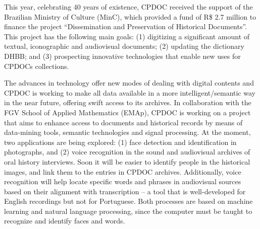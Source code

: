 

This year, celebrating 40 years of existence, CPDOC received the
support of the Brazilian Ministry of Culture (MinC), which provided a
fund of R\$ 2.7 million to finance the project ``Dissemination and
Preservation of Historical Documents''. This project has the following
main goals: (1) digitizing a significant amount of textual,
iconographic and audiovisual documents; (2) updating the dictionary
DHBB; and (3) prospecting innovative technologies that enable new uses
for CPDOCs collections.

The advances in technology offer new modes of dealing with digital
contents and CPDOC is working to make all data available in a more
intelligent/semantic way in the near future, offering swift access to
its archives. In collaboration with the FGV School of Applied
Mathematics (EMAp), CPDOC is working on a project that aims to enhance
access to documents and historical records by means of data-mining
tools, semantic technologies and signal processing. At the moment, two
applications are being explored: (1) face detection and identification
in photographs, and (2) voice recognition in the sound and audiovisual
archives of oral history interviews. Soon it will be easier to
identify people in the historical images, and link them to the entries
in CPDOC archives. Additionally, voice recognition will help locate
specific words and phrases in audiovisual sources based on their
alignment with transcription -- a tool that is well-developed for
English recordings but not for Portuguese. Both processes are based on
machine learning and natural language processing, since the computer
must be taught to recognize and identify faces and words.

